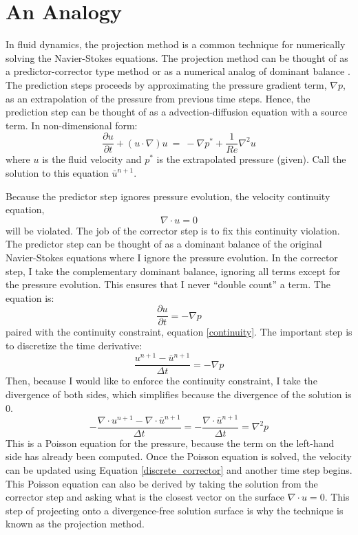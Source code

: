 \documentclass[a4paper]{article}
\begin{document}
\section{An Analogy}
In fluid dynamics, the projection method is a common technique for numerically solving the Navier-Stokes equations. 
The projection method can be thought of as a predictor-corrector type method or as a numerical analog of dominant balance \citep{Guermond2006}.
The prediction steps proceeds by approximating the pressure gradient term, $\nabla p$, as an extrapolation of the 
pressure from previous time steps. 
Hence, the prediction step can be thought of as a advection-diffusion equation with a source term. 
In non-dimensional form:
\begin{equation}
    \frac{\partial u}{\partial t} + (u \cdot \nabla)u ~= ~ -\nabla p^* + \frac{1}{Re}\nabla^2u
    \label{ns_pred}
\end{equation}
where $u$ is the fluid velocity and $p^*$ is the extrapolated pressure (given). Call the solution to this equation $\bar u^{n+1}$.

Because the predictor step ignores pressure evolution, the velocity continuity equation,
\begin{equation}
    \nabla \cdot u = 0
    \label{continuity}
\end{equation}
will be violated. 
The job of the corrector step is to fix this continuity violation.
The predictor step can be thought of as a dominant balance of the original Navier-Stokes equations where I ignore the pressure evolution.
In the corrector step, I take the complementary dominant balance, ignoring all terms except for the pressure evolution. This ensures
that I never ``double count'' a term. The equation is:
\begin{equation}
    \frac{\partial u}{\partial t} = -\nabla p
\end{equation}
paired with the continuity constraint, equation \ref{continuity}.
The important step is to discretize the time derivative:
\begin{equation}
    \frac{u^{n+1} - \bar u^{n+1}}{\Delta t} = -\nabla p
    \label{discrete_corrector}
\end{equation}
Then, because I would like to enforce the continuity constraint,
I take the divergence of both sides, which simplifies because the divergence of the solution is 0.
\begin{equation}
    -\frac{\nabla \cdot u^{n+1} - \nabla \cdot \bar u^{n+1}}{\Delta t} = -\frac{\nabla \cdot \bar u^{n+1}}{\Delta t} = \nabla^2 p
    \label{poisson_pressure}
\end{equation}
This is a Poisson equation for the pressure, because the term on the left-hand side has already been computed.
Once the Poisson equation is solved, the velocity can be updated using Equation \ref{discrete_corrector} and another time step begins. 
This Poisson equation can also be derived by taking the solution from the corrector step and asking what is the closest vector on the
surface $\nabla \cdot u = 0$. This step of projecting onto a divergence-free solution surface is why the technique is known as the projection method.
\end{document}
